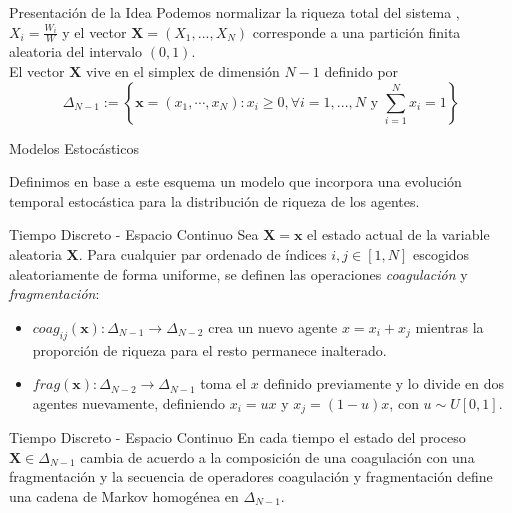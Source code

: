 \begin{frame}{Presentación de la Idea}
Podemos normalizar la riqueza total del sistema , $X_{i}=\frac{W_{i}}{W}$ y el vector $\mathbf{X} = (X_{1},...,X_{N})$ corresponde a una partición finita aleatoria del intervalo $(0,1)$.\\

El vector $\mathbf{X}$  vive en el simplex de dimensión $N-1$ definido por
\[
    \Delta_{N-1} := \left\{ \mathbf{x} = (x_{1},\cdots, x_{N}): x_{i}\geq 0,\forall i=1,...,N \text{ y }\sum\limits_{i=1}^{N}x_{i} = 1 \right\}
\]

\end{frame}

\begin{frame}{Modelos Estocásticos}

Definimos en base a este esquema un modelo que incorpora una evolución temporal estocástica para la distribución de riqueza de los agentes.

\end{frame}

\begin{frame}{Tiempo Discreto - Espacio Continuo}
Sea $\mathbf{X} = \mathbf{x}$ el estado actual de la variable aleatoria $\mathbf{X}$. Para cualquier par ordenado de índices $ i,j \in [1,N]$ escogidos aleatoriamente de forma uniforme, se definen las operaciones {\sl coagulación} y {\sl fragmentación}:
\begin{itemize}
    \item $coag_{ij}(\mathbf{x}): \Delta_{N-1} \rightarrow \Delta_{N-2}$  crea un nuevo agente $x= x_{i}+x_{j}$ mientras la proporción de riqueza para el resto permanece inalterado. %
    \item $frag(\mathbf{x}): \Delta_{N-2} \rightarrow \Delta_{N-1}$ toma el $x$ definido previamente y  lo divide en dos agentes  nuevamente, definiendo $x_{i} = ux$ y $x_{j} = (1-u)x$, con $u\sim U[0,1]$. %
\end{itemize}
\end{frame}

\begin{frame}{Tiempo Discreto - Espacio Continuo}
En cada tiempo el estado del proceso $\mathbf{X}\in \Delta_{N-1}$ cambia de acuerdo a la composición de una coagulación con una fragmentación y la secuencia de operadores coagulación y fragmentación define una cadena de Markov homogénea en $\Delta_{N-1}$.\\
\end{frame}

